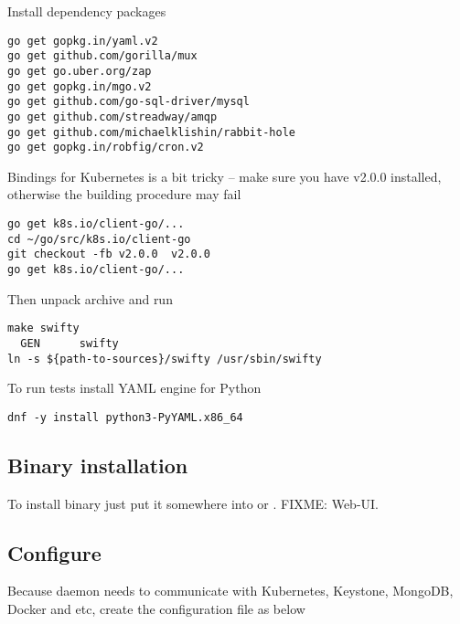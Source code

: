 Install dependency packages

\begin{lstlisting}
go get gopkg.in/yaml.v2
go get github.com/gorilla/mux
go get go.uber.org/zap
go get gopkg.in/mgo.v2
go get github.com/go-sql-driver/mysql
go get github.com/streadway/amqp
go get github.com/michaelklishin/rabbit-hole
go get gopkg.in/robfig/cron.v2
\end{lstlisting}

Bindings for Kubernetes is a bit tricky -- make sure you have v2.0.0 installed,
otherwise the building procedure may fail

\begin{lstlisting}
go get k8s.io/client-go/...
cd ~/go/src/k8s.io/client-go
git checkout -fb v2.0.0  v2.0.0
go get k8s.io/client-go/...
\end{lstlisting}

Then unpack  archive and run

\begin{lstlisting}
make swifty
  GEN      swifty
ln -s ${path-to-sources}/swifty /usr/sbin/swifty
\end{lstlisting}

To run tests install YAML engine for Python

\begin{lstlisting}
dnf -y install python3-PyYAML.x86_64
\end{lstlisting}

\subsection{Binary installation}
\label{subsec:setup-swifty-bin}

To install binary just put it somewhere into 
or . FIXME: Web-UI.

\subsection{Configure}
\label{subsec:setup-swifty-conf}

Because  daemon needs to communicate with Kubernetes,
Keystone, MongoDB, Docker and etc, create the 
configuration file as below

